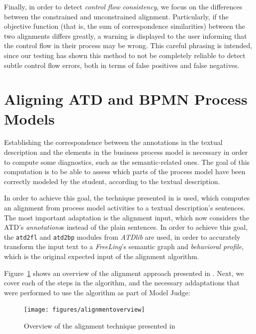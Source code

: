 Finally, in order to detect \emph{control flow consistency}, we focus on the
differences between the constrained and unconstrained alignment. Particularly,
if the objective function (that is, the sum of correspondence similarities)
between the two alignments differs greatly, a warning is displayed to the user
informing that the control flow in their process may be wrong. This careful
phrasing is intended, since our testing has shown this method to not be
completely reliable to detect subtle control flow errors, both in terms of
false positives and false negatives.



\section{Aligning ATD and BPMN Process Models}
\label{sec:aligning_atd_bpmn}

Establishing the correspondence between the annotations in the textual
description and the elements in the business process model is necessary in order
to compute some diagnostics, such as the semantic-related ones. The goal of this
computation is to be able to assess which parts of the process model have been
correctly modeled by the student, according to the textual description.

In order to achieve this goal, the technique presented in
\cite{10.1007/978-3-319-59536-8_26} is used, which computes an alignment from
process model activities to a textual description's sentences. The most
important adaptation is the alignment input, which now considers the ATD's
\emph{annotations}s instead of the plain sentences. In order to achieve this
goal, the \texttt{atd2fl} and \texttt{atd2bp} modules from \emph{ATDlib} are
used, in order to accurately transform the input text to a \emph{FreeLing}'s
semantic graph and \emph{behavioral profile}, which is the original expected
input of the alignment algorithm.

Figure~\ref{fig:alignment_overview} shows an overview of the alignment approach
presented in \cite{10.1007/978-3-319-59536-8_26}. Next, we cover each of the
steps in the algorithm, and the necessary addaptations that were performed to
use the algorithm as part of Model Judge:

\begin{figure}[htb]
  \centering
  \texttt{[image: figures/alignmentoverview]}
  \caption{Overview of the alignment technique presented in \cite{10.1007/978-3-319-59536-8_26}}
  \label{fig:alignment_overview}
\end{figure}
